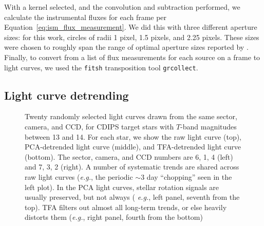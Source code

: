 \documentclass[12pt,twocolumn,tighten]{aastex62}
\begin{document}
With a kernel selected, and the convolution and subtraction performed,
we calculate the instrumental fluxes for each frame per
Equation~\ref{eq:ism_flux_measurement}.  We did this with three
different aperture sizes: for this work, circles of radii 1 pixel, 1.5
pixels, and 2.25 pixels.  These sizes were chosen to roughly span the
range of optimal aperture sizes reported by
\citet{Sullivan_et_al_2015}.  Finally,
to convert from a list of flux measurements for each source on a frame
to light curves, we used the
\texttt{fitsh} transposition tool \texttt{grcollect}.

\subsection{Light curve detrending}
\label{subsec:lcdetrending}

\begin{figure}[!t]
	\vspace{-0.5cm}
	\caption{
    Twenty randomly selected light curves drawn from the same sector,
    camera, and CCD, for CDIPS target stars with $T$-band magnitudes
    between 13 and 14.  For each star, we show the raw light curve
    (top), PCA-detrended light curve (middle), and TFA-detrended light
    curve (bottom).  The sector, camera, and CCD numbers are 6, 1, 4
    (left) and 7, 3, 2 (right).  A number of systematic trends are
    shared across raw light curves ({\it e.g.}, the periodic $\sim$3 day
    ``chopping'' seen in the left plot).  In the PCA light curves,
    stellar rotation signals are usually preserved, but not always ({\it
    e.g.}, left panel, seventh from the top).  TFA filters out almost
    all long-term trends, or else heavily distorts them ({\it e.g.},
    right panel, fourth from the bottom)
	\label{fig:lc_systematics_dtr}
	}
\end{figure}
\end{document}
